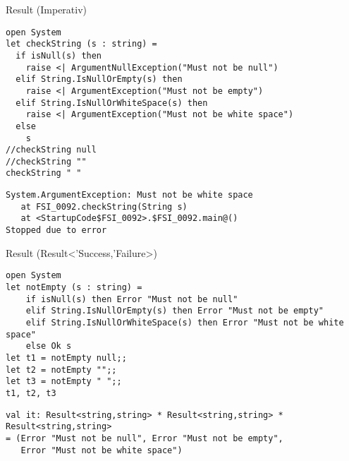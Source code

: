 \documentclass[t]{beamer}
\begin{document}
\begin{frame}[label={sec:org59e58ae},fragile]{Result (Imperativ)}
 \begin{verbatim}
open System
let checkString (s : string) =
  if isNull(s) then
    raise <| ArgumentNullException("Must not be null")
  elif String.IsNullOrEmpty(s) then
    raise <| ArgumentException("Must not be empty")
  elif String.IsNullOrWhiteSpace(s) then
    raise <| ArgumentException("Must not be white space")
  else
    s
//checkString null
//checkString ""
checkString " "
\end{verbatim}

\begin{verbatim}
System.ArgumentException: Must not be white space
   at FSI_0092.checkString(String s)
   at <StartupCode$FSI_0092>.$FSI_0092.main@()
Stopped due to error
\end{verbatim}
\end{frame}

\begin{frame}[label={sec:orga90297b},fragile]{Result (Result<'Success,'Failure>)}
 \begin{verbatim}
open System
let notEmpty (s : string) =
    if isNull(s) then Error "Must not be null"
    elif String.IsNullOrEmpty(s) then Error "Must not be empty"
    elif String.IsNullOrWhiteSpace(s) then Error "Must not be white space"
    else Ok s
let t1 = notEmpty null;;
let t2 = notEmpty "";;
let t3 = notEmpty " ";;
t1, t2, t3
\end{verbatim}

\begin{verbatim}
val it: Result<string,string> * Result<string,string> * Result<string,string>
= (Error "Must not be null", Error "Must not be empty",
   Error "Must not be white space")
\end{verbatim}
\end{frame}
\end{document}
